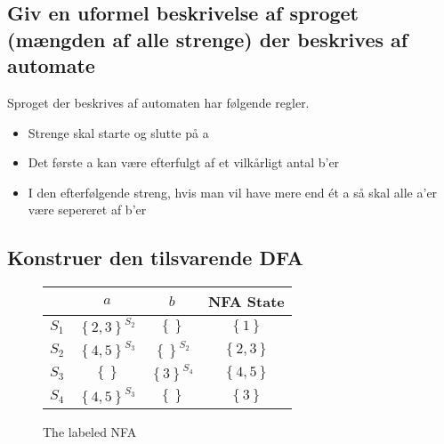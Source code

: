 \documentclass[11pt,a4paper]{article}
\begin{document}
\subsection{Giv en uformel beskrivelse af sproget (mængden af alle strenge) der beskrives af automate}
Sproget der beskrives af automaten har følgende regler.
\begin{itemize}
  \item Strenge skal starte og slutte på a
  \item Det første a kan være efterfulgt af et vilkårligt antal b'er
  \item I den efterfølgende streng, hvis man vil have mere end ét a så skal alle a'er være sepereret af b'er
\end{itemize}
\newpage
\subsection{Konstruer den tilsvarende DFA}
\begin{figure}[!ht]\label{fig:nfa2dfa}
  \centering
  \begin{tabular}{c|ccc}
          & $a$ & $b$ & NFA State\\\hline
    $S_1$ & $\left\{2,3\right\}^{S_2}$ & $\left\{\right\}$ & $\left\{1\right\}$ \\
    $S_2$ & $\left\{4,5\right\}^{S_3}$ & $\left\{\right\}^{S_2}$ & $\left\{2,3\right\}$ \\
    $S_3$ & $\left\{\right\}$ & $\left\{3\right\}^{S_4}$ & $\left\{4,5\right\}$ \\
    $S_4$ & $\left\{4,5\right\}^{S_3}$ & $\left\{\right\}$ & $\left\{3\right\}$ \\
  \end{tabular}
\end{figure}
\begin{figure}[!ht]\label{fig:examfigdfa}
  \centering
  \caption{The labeled NFA}
\end{figure}
\end{document}

